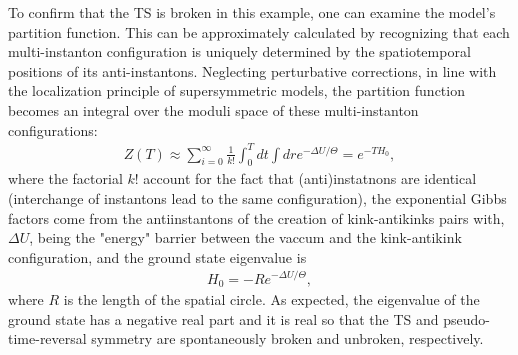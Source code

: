 \documentclass[final,5p,10pt,times,twocolumn,year]{elsarticle}
\begin{document}
To confirm that the TS is broken in this example, one can examine the model's partition function. This can be approximately calculated by recognizing that each multi-instanton configuration is uniquely determined by the spatiotemporal positions of its anti-instantons. Neglecting perturbative corrections, in line with the localization principle of supersymmetric models, the partition function becomes an integral over the moduli space of these multi-instanton configurations:
\begin{eqnarray}
    Z(T) \approx \sum_{i=0}^{\infty} \frac{1}{k!}\int_{0}^T dt \int dr e^{-\Delta U/\Theta} = e^{-T{   H}_0},
\end{eqnarray}
where the factorial $k!$ account for the fact that (anti)instatnons are identical (interchange of instantons lead to the same configuration), the exponential Gibbs factors come from the antiinstantons of the creation of kink-antikinks pairs with, $\Delta U$, being the "energy" barrier between the vaccum and the kink-antikink configuration, and the ground state eigenvalue is
\begin{eqnarray}
    {   H}_0 = -R e^{-\Delta U/\Theta},
\end{eqnarray}
where $R$ is the length of the spatial circle. As expected, the eigenvalue of the ground state has a negative real part and it is real so that the TS and pseudo-time-reversal symmetry are spontaneously broken and unbroken, respectively.

\end{document}
